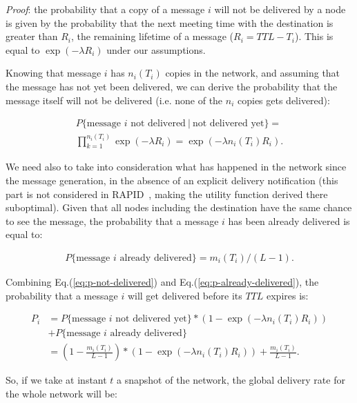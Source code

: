 \emph{Proof}: the probability that a copy of a message $i$ will not be delivered by a node is given by the probability that the next meeting time with the destination is greater than $R_i$, the remaining lifetime of a message ($R_{i} = TTL - T_{i}$). This is equal to $\exp(-\lambda{R_i})$ under our assumptions.

Knowing that message $i$ has $n_i(T_i)$ copies in the network, and assuming that the message has not yet been delivered, we can derive the probability that the message itself will not be delivered (i.e. none of the $n_{i}$ copies gets delivered):

\begin{eqnarray}
P\{\mbox{message\ $i$ not\ delivered}\ |\ \mbox{not\ delivered\ yet}  \}= \nonumber \\
\prod_{k=1}^{n_i(T_i)}\exp(-\lambda R_i ) = \exp(-\lambda n_i(T_i) R_i).
\label{eq:p-not-delivered}
\end{eqnarray}

We need also to take into consideration what has happened in the network since the message generation, in the absence of an explicit delivery notification (this part is not considered in RAPID~\cite{Levine:Sigcomm07}, making the utility function derived there suboptimal). Given that all nodes including the destination have the same chance to see the message, the probability that a message $i$ has been already delivered is equal to:

\begin{align}
P \{ \mbox{message\ $i$ already\ delivered} \} = m_i(T_i) / (L-1).
\label{eq:p-already-delivered}
\end{align}

Combining Eq.(\ref{eq:p-not-delivered}) and Eq.(\ref{eq:p-already-delivered}), the probability that a message $i$ will get delivered before its $TTL$ expires is:

\vspace{-0.4cm}
\small
\begin{align*}
P_i & =  P \{ \mbox{message\ $i$ not\ delivered\ yet} \} *  (1 -\exp(-\lambda n_i(T_i) R_i)) \\
& +  P \{ \mbox{message\ $i$ already delivered} \} \\
& =  (1 - \frac{m_i(T_i)}{L-1})*(1 - \exp(-\lambda n_i(T_i) R_i ))+\frac{m_i(T_i)}{L-1}.
\end{align*}
\normalsize

So, if we take at instant $t$ a snapshot of the network, the global delivery rate for the whole network will be:

